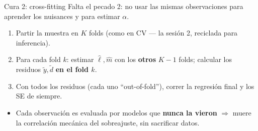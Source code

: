 \documentclass{beamer}
\newcommand{\1}{\mathbb{I}}
\begin{document}
\begin{frame}{Cura 2: cross-fitting}
\small
Falta el pecado 2: no usar las mismas observaciones para aprender los nuisances y para estimar $\alpha$.

\vspace{0.2cm}
\begin{center}
\end{center}
\pause

\begin{enumerate}\itemsep4pt
  \item Partir la muestra en $K$ folds (como en CV --- la sesión 2, reciclada para inferencia).
  \item Para cada fold $k$: estimar $\hat{\ell}, \hat{m}$ con los \textbf{otros} $K-1$ folds; calcular los residuos $\tilde{y}, \tilde{d}$ \textbf{en el fold $k$}.
  \item Con todos los residuos (cada uno ``out-of-fold''), correr la regresión final y los SE de siempre.
\end{enumerate}
\pause

\begin{itemize}\itemsep2pt
  \item Cada observación es evaluada por modelos que \textbf{nunca la vieron} $\Rightarrow$ muere la correlación mecánica del sobreajuste, sin sacrificar datos.
\end{itemize}
\end{frame}
\end{document}
